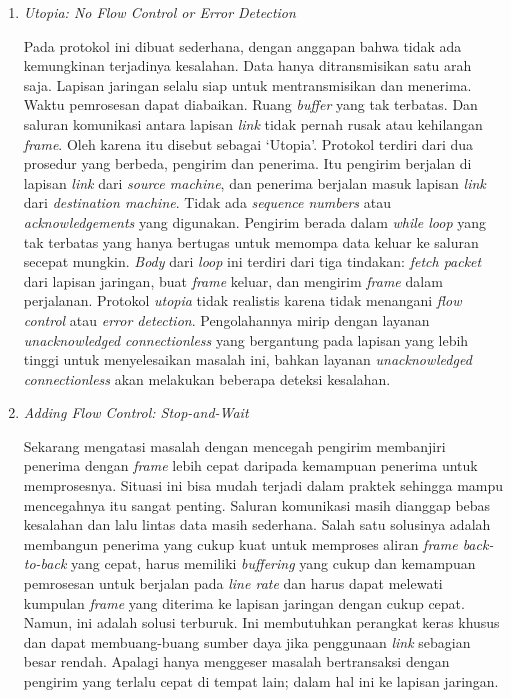 \begin{enumerate}
  \item{\emph{Utopia: No Flow Control or Error Detection}}

  Pada protokol ini dibuat sederhana, dengan anggapan bahwa tidak ada kemungkinan terjadinya kesalahan. Data hanya ditransmisikan satu arah saja. Lapisan jaringan selalu siap untuk mentransmisikan dan menerima. Waktu pemrosesan dapat diabaikan. Ruang \emph{buffer} yang tak terbatas. Dan saluran komunikasi antara lapisan \emph{link} tidak pernah rusak atau kehilangan \emph{frame}. Oleh karena itu disebut sebagai `Utopia'. Protokol terdiri dari dua prosedur yang berbeda, pengirim dan penerima. Itu pengirim berjalan di lapisan \emph{link} dari \emph{source machine}, dan penerima berjalan masuk lapisan \emph{link} dari \emph{destination machine}. Tidak ada \emph{sequence numbers} atau \emph{acknowledgements} yang digunakan. Pengirim berada dalam \emph{while loop} yang tak terbatas yang hanya bertugas untuk memompa data keluar ke saluran secepat mungkin. \emph{Body} dari \emph{loop} ini terdiri dari tiga tindakan: \emph{fetch packet} dari lapisan jaringan, buat \emph{frame} keluar, dan mengirim \emph{frame} dalam perjalanan. Protokol \emph{utopia} tidak realistis karena tidak menangani \emph{flow control} atau \emph{error detection}. Pengolahannya mirip dengan layanan \emph{unacknowledged connectionless} yang bergantung pada lapisan yang lebih tinggi untuk menyelesaikan masalah ini, bahkan layanan \emph{unacknowledged connectionless} akan melakukan beberapa deteksi kesalahan.

  \item{\emph{Adding Flow Control: Stop-and-Wait}}

  Sekarang mengatasi masalah dengan mencegah pengirim membanjiri penerima dengan \emph{frame} lebih cepat daripada kemampuan penerima untuk memprosesnya. Situasi ini bisa mudah terjadi dalam praktek sehingga mampu mencegahnya itu sangat penting. Saluran komunikasi masih dianggap bebas kesalahan dan lalu lintas data masih sederhana. Salah satu solusinya adalah membangun penerima yang cukup kuat untuk memproses aliran \emph{frame back-to-back} yang cepat, harus memiliki \emph{buffering} yang cukup dan kemampuan pemrosesan untuk berjalan pada \emph{line rate} dan harus dapat melewati kumpulan \emph{frame} yang diterima ke lapisan jaringan dengan cukup cepat. Namun, ini adalah solusi terburuk. Ini membutuhkan perangkat keras khusus dan dapat membuang-buang sumber daya jika penggunaan \emph{link} sebagian besar rendah. Apalagi hanya menggeser masalah bertransaksi dengan pengirim yang terlalu cepat di tempat lain; dalam hal ini ke lapisan jaringan.


\end{enumerate}

